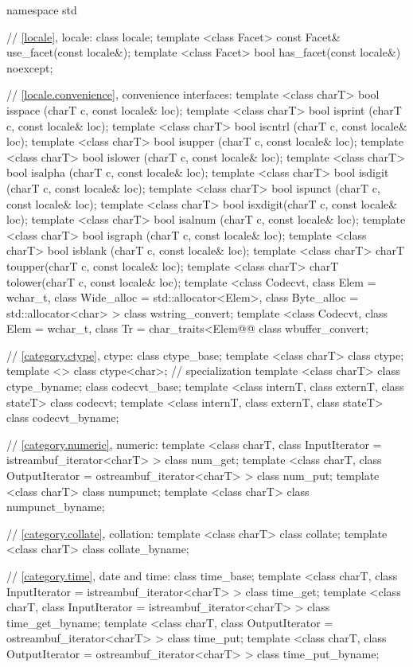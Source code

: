 %
\begin{codeblock}
namespace std {
  // \ref{locale}, locale:
  class locale;
  template <class Facet> const Facet& use_facet(const locale&);
  template <class Facet> bool         has_facet(const locale&) noexcept;

  // \ref{locale.convenience}, convenience interfaces:
  template <class charT> bool isspace (charT c, const locale& loc);
  template <class charT> bool isprint (charT c, const locale& loc);
  template <class charT> bool iscntrl (charT c, const locale& loc);
  template <class charT> bool isupper (charT c, const locale& loc);
  template <class charT> bool islower (charT c, const locale& loc);
  template <class charT> bool isalpha (charT c, const locale& loc);
  template <class charT> bool isdigit (charT c, const locale& loc);
  template <class charT> bool ispunct (charT c, const locale& loc);
  template <class charT> bool isxdigit(charT c, const locale& loc);
  template <class charT> bool isalnum (charT c, const locale& loc);
  template <class charT> bool isgraph (charT c, const locale& loc);
  template <class charT> bool isblank (charT c, const locale& loc);
  template <class charT> charT toupper(charT c, const locale& loc);
  template <class charT> charT tolower(charT c, const locale& loc);
  template <class Codecvt, class Elem = wchar_t,
    class Wide_alloc = std::allocator<Elem>,
    class Byte_alloc = std::allocator<char> > class wstring_convert;
  template <class Codecvt, class Elem = wchar_t,
     class Tr = char_traits<Elem@\shr{}@ class wbuffer_convert;

  // \ref{category.ctype}, ctype:
  class ctype_base;
  template <class charT> class ctype;
  template <>            class ctype<char>;             // specialization
  template <class charT> class ctype_byname;
  class codecvt_base;
  template <class internT, class externT, class stateT> class codecvt;
  template <class internT, class externT, class stateT> class codecvt_byname;

  // \ref{category.numeric}, numeric:
  template <class charT, class InputIterator = istreambuf_iterator<charT> >  class num_get;
  template <class charT, class OutputIterator = ostreambuf_iterator<charT> > class num_put;
  template <class charT> class numpunct;
  template <class charT> class numpunct_byname;

  // \ref{category.collate}, collation:
  template <class charT> class collate;
  template <class charT> class collate_byname;

  // \ref{category.time}, date and time:
  class time_base;
  template <class charT, class InputIterator = istreambuf_iterator<charT> >
    class time_get;
  template <class charT, class InputIterator = istreambuf_iterator<charT> >
    class time_get_byname;
  template <class charT, class OutputIterator = ostreambuf_iterator<charT> >
    class time_put;
  template <class charT, class OutputIterator = ostreambuf_iterator<charT> >
    class time_put_byname;

}
\end{codeblock}
